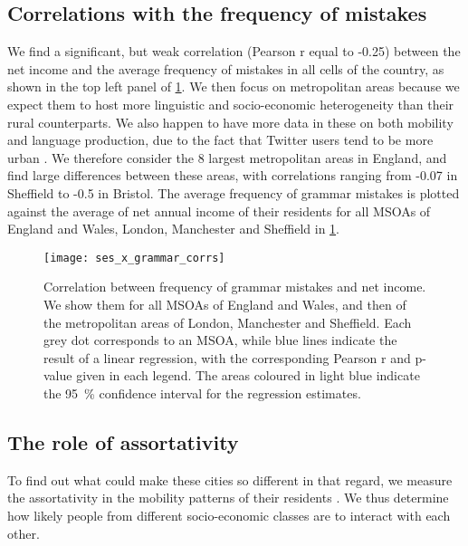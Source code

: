 \documentclass[../thesis.tex]{subfiles}
\begin{document}
\subsection{Correlations with the frequency of mistakes}
We find a significant, but weak correlation (Pearson r equal to -0.25) between the net
income and the average frequency of mistakes in all cells of the country, as shown in
the top left panel of \cref{fig:ses_x_grammar_corrs}. We then focus on metropolitan
areas because we expect them to host more linguistic and socio-economic heterogeneity
than their rural counterparts. We also happen to have more data in these on both
mobility and language production, due to the fact that Twitter users tend to be more
urban \cite{MisloveUnderstandingDemographics2011}. We therefore consider the 8 largest
metropolitan areas in England, and find large differences between these areas, with
correlations ranging from -0.07 in Sheffield to -0.5 in Bristol. The average frequency
of grammar mistakes is plotted against the average of net annual income of their
residents for all \acp{MSOA} of England and Wales, London, Manchester and Sheffield in
\cref{fig:ses_x_grammar_corrs}.
\begin{figure}
\centering
  \texttt{[image: ses\_x\_grammar\_corrs]}
  \caption{ Correlation between frequency of grammar mistakes and net income. We show
  them for all \acp{MSOA} of England and Wales, and then of the metropolitan areas of
  London, Manchester and Sheffield. Each grey dot corresponds to an \ac{MSOA}, while
  blue lines indicate the result of a linear regression, with the corresponding Pearson
  r and p-value given in each legend. The areas coloured in light blue indicate the
  \SI{95}{\percent} confidence interval for the regression estimates.}
  \label{fig:ses_x_grammar_corrs}
\end{figure}


\subsection{The role of assortativity}

To find out what could make these cities so different in that regard, we measure the
assortativity in the mobility patterns of their residents
\cite{HilmanSocioeconomicBiases2022}. We thus determine how likely people from different
socio-economic classes are to interact with each other.
\end{document}
